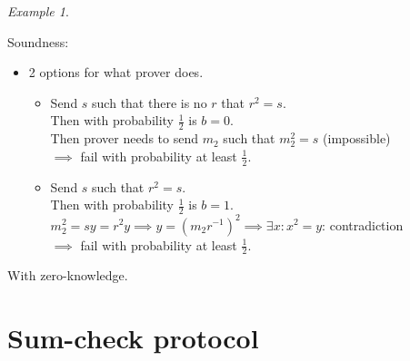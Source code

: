 \documentclass[a4paper, 12pt]{book}
\theoremstyle{definition}
\theoremstyle{remark}
\newtheorem*{ex}{Example}
\begin{document}
\begin{ex}
\begin{itemize}[label={}]
\begin{itemize}[label={}]
    \end{itemize}
  \end{itemize}
  Soundness:
  \begin{itemize}
    \item 2 options for what prover does.
    \begin{itemize}
      \item Send $s$ such that there is no $r$ that $r^2 = s$. \\
        Then with probability $\frac{1}{2}$ is $b = 0$. \\
        Then prover needs to send $m_2$ such that $m_2^2 = s$ (impossible) \\
        $\implies$ fail with probability at least $\frac{1}{2}$.
      \item Send $s$ such that $r^2 = s$. \\
        Then with probability $\frac{1}{2}$ is $b = 1$. \\
        $m_2^2 = s y = r^2 y \implies y = (m_2 r^{-1})^2 \implies \exists x: x^2 = y$: contradiction \\
        $\implies$ fail with probability at least $\frac{1}{2}$.
    \end{itemize}
  \end{itemize}
  With zero-knowledge.
\end{ex}


\section{Sum-check protocol}
\end{document}
